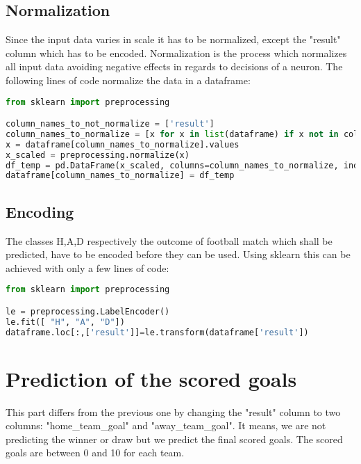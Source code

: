\subsection {Normalization}
Since the input data varies in scale it has to be normalized, except the "result" column which has to be encoded. Normalization is the process which normalizes all input data avoiding negative effects in regards to decisions of a neuron. 
The following lines of code normalize the data in a dataframe:

\begin{lstlisting}[language=Python, caption=Python code for normalization]
from sklearn import preprocessing

column_names_to_not_normalize = ['result']
column_names_to_normalize = [x for x in list(dataframe) if x not in column_names_to_not_normalize ]
x = dataframe[column_names_to_normalize].values
x_scaled = preprocessing.normalize(x)
df_temp = pd.DataFrame(x_scaled, columns=column_names_to_normalize, index = dataframe.index)
dataframe[column_names_to_normalize] = df_temp
\end{lstlisting}



\subsection {Encoding}

The classes H,A,D respectively the outcome of football match which shall be predicted, have to be encoded before they can be used. Using sklearn this can be achieved with only a few lines of code:

\begin{lstlisting}[language=Python, caption=Python code for encoding classes]
from sklearn import preprocessing

le = preprocessing.LabelEncoder()
le.fit([ "H", "A", "D"])
dataframe.loc[:,['result']]=le.transform(dataframe['result'])
\end{lstlisting}



\section {Prediction of the scored goals}

This part differs from the previous one by changing the "result" column to two columns: "home\_team\_goal" and "away\_team\_goal". It means, we are not predicting the winner or draw but we predict the final scored goals. The scored goals are between 0 and 10 for each team.


